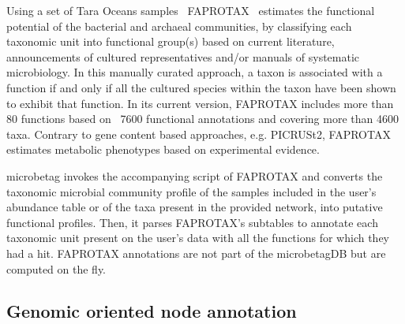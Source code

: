 \documentclass[sn-mathphys,Numbered, lineno]{sn-jnl}  %
\theoremstyle{thmstyleone}%
\theoremstyle{thmstyletwo}%
\theoremstyle{thmstylethree}%
\begin{document}
        Using a set of Tara Oceans samples~\cite{sunagawa2015structure} FAPROTAX~\cite{louca2016decoupling} estimates the functional potential of the bacterial and archaeal communities, by classifying each taxonomic unit into functional group(s) based on current literature,
        announcements of cultured representatives and/or manuals of systematic microbiology. 
        In this manually curated approach, a taxon is associated with a function if and only if all the cultured species within the taxon have been shown to exhibit that function. 
        In its current version, FAPROTAX includes more than 80 functions based on ~7600 functional annotations and covering more than 4600 taxa.
        Contrary to gene content based approaches, e.g. PICRUSt2, FAPROTAX  estimates metabolic phenotypes based on experimental evidence. 

        microbetag invokes the accompanying script of FAPROTAX and converts the taxonomic microbial community profile of the samples included in the user's abundance table or of the taxa present in the provided network, into putative functional profiles.
        Then, it parses FAPROTAX's subtables to annotate each taxonomic unit present on the user's data with all the functions for which they had a hit. 
        FAPROTAX annotations are not part of the microbetagDB but are computed on the fly.


    \subsection*{ Genomic oriented node annotation }
    \label{subsec:phen}
\end{document}
